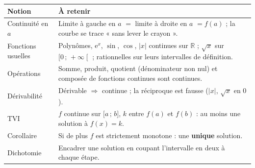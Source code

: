 \documentclass[11pt,a4paper]{article}
\newcommand{\R}{\mathbb{R}}
\newcommand{\e}{\mathrm{e}}
\newcommand{\intff}[2]{\mathopen{[}#1\,;\,#2\mathclose{]}}
\newcommand{\intfo}[2]{\mathopen{[}#1\,;\,#2\mathclose{[}}
\begin{document}
\begin{center}
\renewcommand{\arraystretch}{1.5}
\begin{tabular}{|>{\raggedright\arraybackslash}m{4.2cm}|>{\raggedright\arraybackslash}m{11.6cm}|}
\hline
\rowcolor{bleuclair}\textbf{Notion} & \textbf{À retenir} \\ \hline
Continuité en $a$ & Limite à gauche en $a$ $=$ limite à droite en $a$ $=f(a)$ ;
  la courbe se trace « sans lever le crayon ». \\ \hline
Fonctions usuelles & Polynômes, $\e^x$, $\sin$, $\cos$, $\lvert x\rvert$ continues sur $\R$ ; $\sqrt{x}$ sur $\intfo{0}{+\infty}$ ; rationnelles sur leurs intervalles de définition. \\ \hline
Opérations & Somme, produit, quotient (dénominateur non nul) et composée de fonctions continues sont continues. \\ \hline
Dérivabilité & Dérivable $\Longrightarrow$ continue ; la réciproque est fausse ($\lvert x\rvert$, $\sqrt{x}$ en $0$). \\ \hline
TVI & $f$ continue sur $\intff{a}{b}$, $k$ entre $f(a)$ et $f(b)$ : au moins une solution à $f(x)=k$. \\ \hline
Corollaire & Si de plus $f$ est strictement monotone : une \textbf{unique} solution. \\ \hline
Dichotomie & Encadrer une solution en coupant l'intervalle en deux à chaque étape. \\ \hline
\end{tabular}
\end{center}
\end{document}
